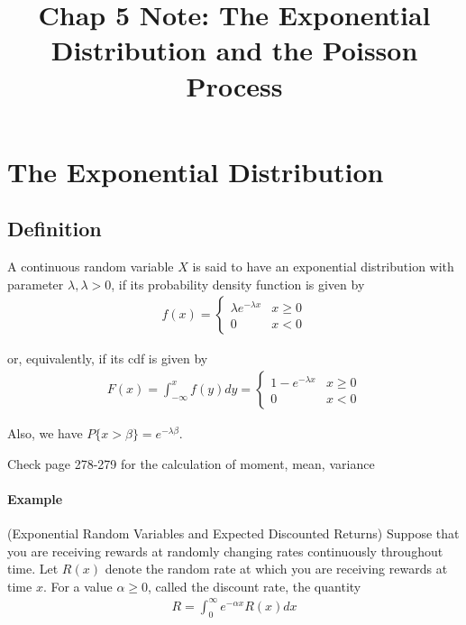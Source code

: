 \documentclass[10 pt,final]{article}
\title{Chap 5 Note: The Exponential Distribution and the Poisson Process}
\newcommand{\impo}[1]{{\color{magenta} #1}}
\begin{document}
\date{}

\maketitle

\section{The Exponential Distribution} 
\subsection{Definition}

A continuous random variable $X$ is said to have an exponential distribution with parameter $\lambda, \lambda > 0$, if its probability density function is given by
\begin{align*}
f(x) =
\begin{cases}
\lambda e^{-\lambda x} & x \geq 0\\
0 & x <0
\end{cases}
\end{align*}

or, equivalently, if its cdf is given by
\begin{align*}
F(x) = \int_{-\infty}^{x} f(y)dy = 
\begin{cases}
1 -e^{-\lambda x} & x \geq 0 \\
0 & x <0
\end{cases}
\end{align*}

Also, we have \impo{$P\{x>\beta\} = e^{-\lambda \beta}$}.

Check page 278-279 for the calculation of moment, mean, variance

\paragraph{Example} (Exponential Random Variables and Expected Discounted Returns) Suppose that you are receiving rewards at randomly changing rates continuously throughout time. Let $R(x)$ denote the random rate at which you are receiving rewards at time $x$. For a value $\alpha \geq 0$, called the discount rate, the quantity 
\begin{align*}
R = \int_0^{\infty} e^{-\alpha x} R(x) dx
\end{align*}
\end{document}
